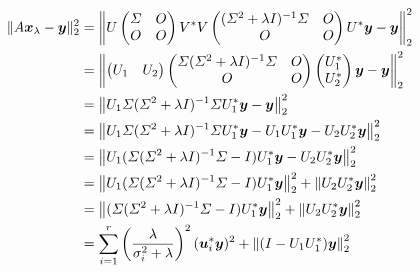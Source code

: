 \begin{align}
    \|A \bm{x}_{\lambda} - \bm{y}\|_2^2
     & = \left\| U
    \begin{pmatrix}
        \varSigma & O \\
        O      & O
    \end{pmatrix}
    V^* V
    \begin{pmatrix}
        (\varSigma^2 + \lambda I)^{-1} \varSigma & O \\
        O                                  & O
    \end{pmatrix}
    U^* \bm{y} - \bm{y} \right\|_2^2
    \notag                                                                                        \\
     & = \left\|
    \begin{pmatrix}
        U_1 & U_2
    \end{pmatrix}
    \begin{pmatrix}
        \varSigma (\varSigma^2 + \lambda I)^{-1} \varSigma & O \\
        O                                         & O
    \end{pmatrix}
    \begin{pmatrix}
        U_1^* \\ U_2^*
    \end{pmatrix}
    \bm{y} - \bm{y} \right\|_2^2
    \notag                                                                                        \\
     & = \left\| U_1 \varSigma (\varSigma^2 + \lambda I)^{-1} \varSigma U_1^* \bm{y} - \bm{y} \right\|_2^2
    \notag                                                                                        \\
     & = \left\| U_1 \varSigma (\varSigma^2 + \lambda I)^{-1} \varSigma U_1^* \bm{y}
    - U_1 U_1^* \bm{y} - U_2 U_2^* \bm{y} \right\|_2^2
    \notag                                                                                        \\
     & = \left\| U_1 (\varSigma (\varSigma^2 + \lambda I)^{-1} \varSigma - I) U_1^* \bm{y}
    - U_2 U_2^* \bm{y} \right\|_2^2
    \notag                                                                                        \\
     & = \left\| U_1 (\varSigma (\varSigma^2 + \lambda I)^{-1} \varSigma - I) U_1^* \bm{y} \right\|_2^2
    + \left\| U_2 U_2^* \bm{y} \right\|_2^2
    \notag                                                                                        \\
     & = \left\| (\varSigma (\varSigma^2 + \lambda I)^{-1} \varSigma - I) U_1^* \bm{y} \right\|_2^2
    + \left\| U_2 U_2^* \bm{y} \right\|_2^2
    \notag                                                                                        \\
     & = \sum_{i = 1}^r \left(\frac{\lambda}{\sigma_i^2 + \lambda}\right)^2 (\bm{u}_i^* \bm{y})^2
    + \left\| (I - U_1 U_1^*) \bm{y} \right\|_2^2
\end{align}

